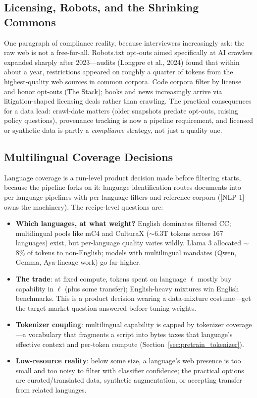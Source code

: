 \subsection{Licensing, Robots, and the Shrinking Commons}

One paragraph of compliance reality, because interviewers increasingly ask: the raw web is not a free-for-all. Robots.txt opt-outs aimed specifically at AI crawlers expanded sharply after 2023---audits (Longpre et al., 2024) found that within about a year, restrictions appeared on roughly a quarter of tokens from the highest-quality web sources in common corpora. Code corpora filter by license and honor opt-outs (The Stack); books and news increasingly arrive via litigation-shaped licensing deals rather than crawling. The practical consequences for a data lead: crawl-date matters (older snapshots predate opt-outs, raising policy questions), provenance tracking is now a pipeline requirement, and licensed or synthetic data is partly a \textit{compliance} strategy, not just a quality one.

\subsection{Multilingual Coverage Decisions}

Language coverage is a run-level product decision made before filtering starts, because the pipeline forks on it: language identification routes documents into per-language pipelines with per-language filters and reference corpora ([NLP 1] owns the machinery). The recipe-level questions are:

\begin{itemize}
    \item \textbf{Which languages, at what weight?} English dominates filtered CC; multilingual pools like mC4 and CulturaX ($\sim$6.3T tokens across 167 languages) exist, but per-language quality varies wildly. Llama 3 allocated $\sim$8\% of tokens to non-English; models with multilingual mandates (Qwen, Gemma, Aya-lineage work) go far higher.
    \item \textbf{The trade}: at fixed compute, tokens spent on language $\ell$ mostly buy capability in $\ell$ (plus some transfer); English-heavy mixtures win English benchmarks. This is a product decision wearing a data-mixture costume---get the target market question answered before tuning weights.
    \item \textbf{Tokenizer coupling}: multilingual capability is capped by tokenizer coverage---a vocabulary that fragments a script into bytes taxes that language's effective context and per-token compute (Section~\ref{sec:pretrain_tokenizer}).
    \item \textbf{Low-resource reality}: below some size, a language's web presence is too small and too noisy to filter with classifier confidence; the practical options are curated/translated data, synthetic augmentation, or accepting transfer from related languages.
\end{itemize}

